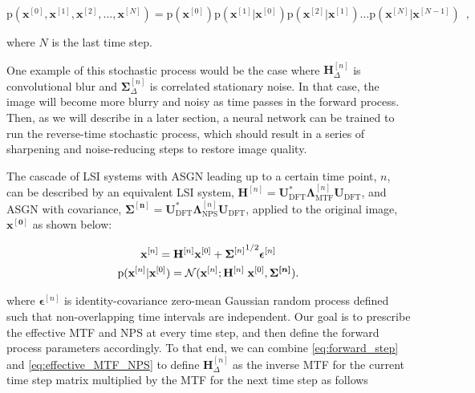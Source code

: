 \documentclass[12pt,]{article}
\begin{document}
\begin{equation}
\text{p}(\mathbf{x}^{[0]}, \mathbf{x}^{[1]},\mathbf{x}^{[2]},\ldots,\mathbf{x}^{[N]}) = \text{p}(\mathbf{x}^{[0]})\text{p}(\mathbf{x}^{[1]}| \mathbf{x}^{[0]})\text{p}(\mathbf{x}^{[2]}| \mathbf{x}^{[1]})\ldots\text{p}(\mathbf{x}^{[N]}| \mathbf{x}^{[N-1]}) \enspace ,
\end{equation}


\noindent where $N$ is the last time step. 

One example of this stochastic process would be the case where $\mathbf{H}_\Delta^{[n]}$ is convolutional blur and ${\boldsymbol{\Sigma}_\Delta^{[n]}}$ is correlated stationary noise. In that case, the image will become more blurry and noisy as time passes in the forward process. Then, as we will describe in a later section, a neural network can be trained to run the reverse-time stochastic process, which should result in a series of sharpening and noise-reducing steps to restore image quality.


The cascade of LSI systems with ASGN leading up to a certain time point, $n$, can be described by an equivalent LSI system, $\mathbf{H}^{[n]} =  \mathbf{U}^*_\text{DFT} \boldsymbol{\Lambda}_{\text{MTF}}^{[n]} \mathbf{U}_\text{DFT}$, and ASGN with covariance, $\boldsymbol{\Sigma^{[n]}}=\mathbf{U}^*_\text{DFT}\boldsymbol{\Lambda}_{\text{NPS}}^{[n]}\mathbf{U}_\text{DFT}$, applied to the original image, $\mathbf{x^{[0]}}$ as shown below:

\begin{gather}
    \mathbf{x}^{[n]} = \mathbf{H}^{[n]} \mathbf{x}^{[0]} + {\boldsymbol{\Sigma}^{[n]}}^{ \hspace{0mm} 1/2} \boldsymbol{\epsilon}^{[n]}\\
    \text{p}(\mathbf{x}^{[n]}|\mathbf{x}^{[0]}) = \mathcal{N}(\mathbf{x}^{[n]} ;   \mathbf{H}^{[n]} \hspace{1mm} \mathbf{x}^{[0]},  \boldsymbol{\Sigma^{[n]}} ) .
    \label{eq:effective_MTF_NPS}
\end{gather}

\noindent where $\boldsymbol{\epsilon}^{[n]}$ is identity-covariance zero-mean Gaussian random process defined such that non-overlapping time intervals are independent. Our goal is to prescribe the effective MTF and NPS at every time step, and then define the forward process parameters accordingly. To that end, we can combine \eqref{eq:forward_step} and \eqref{eq:effective_MTF_NPS} to define $\mathbf{H}_\Delta^{[n]}$ as the inverse MTF for the current time step matrix multiplied by the MTF for the next time step as follows
\end{document}
